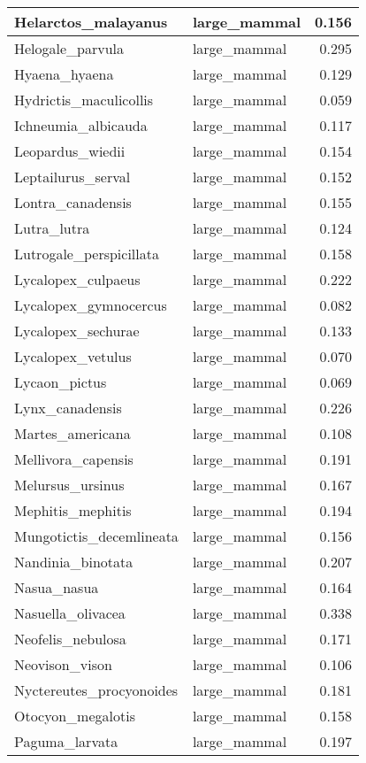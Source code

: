 \begin{table}
\begin{tabular}[t]{l|l|r}
\hline
Helarctos\_malayanus & large\_mammal & 0.156\\
\hline
Helogale\_parvula & large\_mammal & 0.295\\
\hline
Hyaena\_hyaena & large\_mammal & 0.129\\
\hline
Hydrictis\_maculicollis & large\_mammal & 0.059\\
\hline
Ichneumia\_albicauda & large\_mammal & 0.117\\
\hline
Leopardus\_wiedii & large\_mammal & 0.154\\
\hline
Leptailurus\_serval & large\_mammal & 0.152\\
\hline
Lontra\_canadensis & large\_mammal & 0.155\\
\hline
Lutra\_lutra & large\_mammal & 0.124\\
\hline
Lutrogale\_perspicillata & large\_mammal & 0.158\\
\hline
Lycalopex\_culpaeus & large\_mammal & 0.222\\
\hline
Lycalopex\_gymnocercus & large\_mammal & 0.082\\
\hline
Lycalopex\_sechurae & large\_mammal & 0.133\\
\hline
Lycalopex\_vetulus & large\_mammal & 0.070\\
\hline
Lycaon\_pictus & large\_mammal & 0.069\\
\hline
Lynx\_canadensis & large\_mammal & 0.226\\
\hline
Martes\_americana & large\_mammal & 0.108\\
\hline
Mellivora\_capensis & large\_mammal & 0.191\\
\hline
Melursus\_ursinus & large\_mammal & 0.167\\
\hline
Mephitis\_mephitis & large\_mammal & 0.194\\
\hline
Mungotictis\_decemlineata & large\_mammal & 0.156\\
\hline
Nandinia\_binotata & large\_mammal & 0.207\\
\hline
Nasua\_nasua & large\_mammal & 0.164\\
\hline
Nasuella\_olivacea & large\_mammal & 0.338\\
\hline
Neofelis\_nebulosa & large\_mammal & 0.171\\
\hline
Neovison\_vison & large\_mammal & 0.106\\
\hline
Nyctereutes\_procyonoides & large\_mammal & 0.181\\
\hline
Otocyon\_megalotis & large\_mammal & 0.158\\
\hline
Paguma\_larvata & large\_mammal & 0.197\\

\end{tabular}
\end{table}
